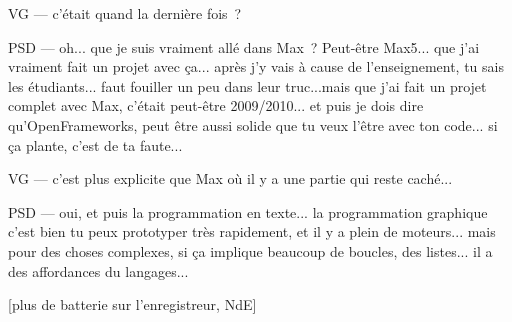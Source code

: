 VG — c'était quand la dernière fois ?

PSD — oh... que je suis vraiment allé dans Max ? Peut-être Max5... que j'ai vraiment fait un projet avec ça... après j'y vais à cause de l'enseignement, tu sais les étudiants... faut fouiller un peu dans leur truc...mais que j'ai fait un projet complet avec Max, c'était peut-être 2009/2010... et puis je dois dire qu'OpenFrameworks, peut être aussi solide que tu veux l'être avec ton code... si ça plante, c'est de ta faute...

VG — c'est plus explicite que Max où il y a une partie qui reste caché...

PSD — oui, et puis la programmation en texte... la programmation graphique c'est bien tu peux prototyper très rapidement, et il y a plein de moteurs... mais pour des choses complexes, si ça implique beaucoup de boucles, des listes... il a des affordances du langages...

[plus de batterie sur l'enregistreur, NdE]